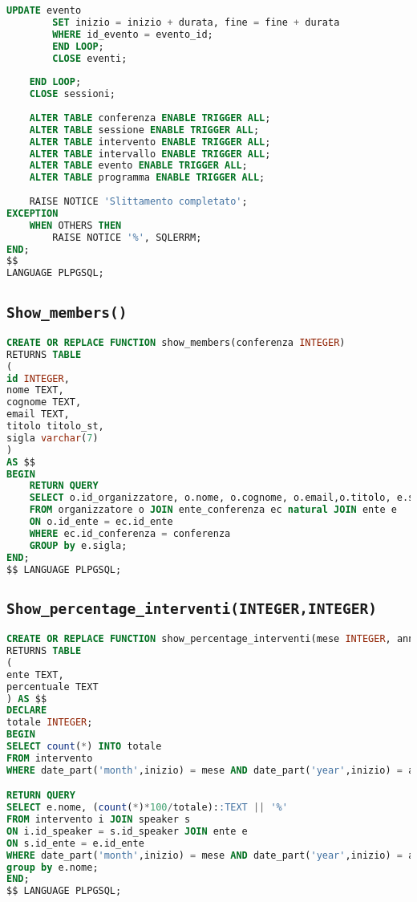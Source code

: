 \begin{lstlisting}[language=SQL,style=mystyle]
		UPDATE evento
		SET inizio = inizio + durata, fine = fine + durata
		WHERE id_evento = evento_id;
		END LOOP;
		CLOSE eventi;
	
	END LOOP;
	CLOSE sessioni;
	
	ALTER TABLE conferenza ENABLE TRIGGER ALL;
	ALTER TABLE sessione ENABLE TRIGGER ALL;
	ALTER TABLE intervento ENABLE TRIGGER ALL;
	ALTER TABLE intervallo ENABLE TRIGGER ALL;
	ALTER TABLE evento ENABLE TRIGGER ALL;
	ALTER TABLE programma ENABLE TRIGGER ALL;
	
	RAISE NOTICE 'Slittamento completato';
EXCEPTION
	WHEN OTHERS THEN
		RAISE NOTICE '%', SQLERRM;
END;
$$ 
LANGUAGE PLPGSQL;
\end{lstlisting}

\subsection{\texttt{Show\_members()}}
\begin{lstlisting}[language=SQL,style=mystyle]
CREATE OR REPLACE FUNCTION show_members(conferenza INTEGER)
RETURNS TABLE 
(
id INTEGER, 
nome TEXT, 
cognome TEXT, 
email TEXT,
titolo titolo_st, 
sigla varchar(7)
) 
AS $$
BEGIN
	RETURN QUERY
	SELECT o.id_organizzatore, o.nome, o.cognome, o.email,o.titolo, e.sigla
	FROM organizzatore o JOIN ente_conferenza ec natural JOIN ente e  
	ON o.id_ente = ec.id_ente
	WHERE ec.id_conferenza = conferenza
	GROUP by e.sigla;
END;
$$ LANGUAGE PLPGSQL;
\end{lstlisting}
\subsection{\texttt{Show\_percentage\_interventi(INTEGER,INTEGER)}}
\begin{lstlisting}[language=SQL,style=mystyle]
CREATE OR REPLACE FUNCTION show_percentage_interventi(mese INTEGER, anno INTEGER)
RETURNS TABLE
(
ente TEXT,
percentuale TEXT
) AS $$
DECLARE
totale INTEGER;
BEGIN
SELECT count(*) INTO totale
FROM intervento
WHERE date_part('month',inizio) = mese AND date_part('year',inizio) = anno;

RETURN QUERY
SELECT e.nome, (count(*)*100/totale)::TEXT || '%'
FROM intervento i JOIN speaker s 
ON i.id_speaker = s.id_speaker JOIN ente e 
ON s.id_ente = e.id_ente
WHERE date_part('month',inizio) = mese AND date_part('year',inizio) = anno
group by e.nome;
END;
$$ LANGUAGE PLPGSQL;
\end{lstlisting}
